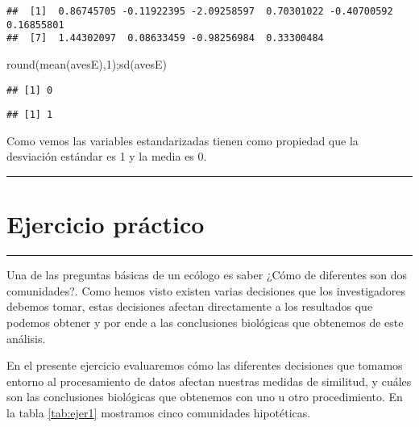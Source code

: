 \documentclass[
]{article}
\newenvironment{Shaded}{\begin{snugshade}}{\end{snugshade}}
\newcommand{\DecValTok}[1]{\textcolor[rgb]{0.00,0.00,0.81}{#1}}
\newcommand{\FunctionTok}[1]{\textcolor[rgb]{0.00,0.00,0.00}{#1}}
\newcommand{\NormalTok}[1]{#1}
\begin{document}
\begin{verbatim}
##  [1]  0.86745705 -0.11922395 -2.09258597  0.70301022 -0.40700592  0.16855801
##  [7]  1.44302097  0.08633459 -0.98256984  0.33300484
\end{verbatim}

\begin{Shaded}
\begin{Highlighting}[]
\FunctionTok{round}\NormalTok{(}\FunctionTok{mean}\NormalTok{(avesE),}\DecValTok{1}\NormalTok{);}\FunctionTok{sd}\NormalTok{(avesE) }
\end{Highlighting}
\end{Shaded}

\begin{verbatim}
## [1] 0
\end{verbatim}

\begin{verbatim}
## [1] 1
\end{verbatim}

Como vemos las variables estandarizadas tienen como propiedad que la desviación estándar es 1 y la media es 0.

\begin{center}\rule{0.5\linewidth}{0.5pt}\end{center}

\hypertarget{ejercicio-pruxe1ctico}{%
\section{Ejercicio práctico}\label{ejercicio-pruxe1ctico}}

\begin{center}\rule{0.5\linewidth}{0.5pt}\end{center}

Una de las preguntas básicas de un ecólogo es saber ¿Cómo de diferentes son dos comunidades?. Como hemos visto existen varias decisiones que los investigadores debemos tomar, estas decisiones afectan directamente a los resultados que podemos obtener y por ende a las conclusiones biológicas que obtenemos de este análisis.

En el presente ejercicio evaluaremos cómo las diferentes decisiones que tomamos entorno al procesamiento de datos afectan nuestras medidas de similitud, y cuáles son las conclusiones biológicas que obtenemos con uno u otro procedimiento. En la tabla \ref{tab:ejer1} mostramos cinco comunidades hipotéticas.
\end{document}
